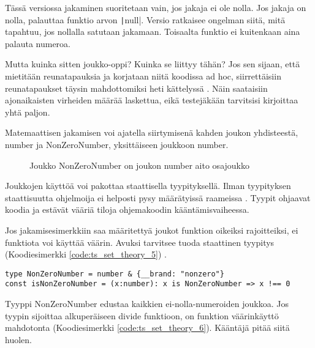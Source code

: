 Tässä versiossa jakaminen suoritetaan vain, jos jakaja ei ole nolla. Jos jakaja on nolla, palauttaa funktio arvon \texttt|null|. Versio ratkaisee ongelman siitä, mitä tapahtuu, jos nollalla satutaan jakamaan. Toisaalta funktio ei kuitenkaan aina palauta numeroa.

Mutta kuinka sitten joukko-oppi? Kuinka se liittyy tähän? Jos sen sijaan, että mietitään reunatapauksia ja korjataan niitä koodissa ad hoc, siirrettäisiin reunatapaukset täysin mahdottomiksi heti kättelyssä \cite{impossiblebetter}. Näin saataisiin ajonaikaisten virheiden määrää laskettua, eikä testejäkään tarvitsisi kirjoittaa yhtä paljon.

Matemaattisen jakamisen voi ajatella siirtymisenä kahden joukon yhdisteestä, number ja NonZeroNumber, yksittäiseen joukkoon number.

\begin{figure}[ht]
    \centering
    \caption{Joukko NonZeroNumber on joukon number aito osajoukko}
    \label{fig:set-esimerkki}
\end{figure}

Joukkojen käyttöä voi pakottaa staattisella tyypityksellä. Ilman tyypityksen staattisuutta ohjelmoija ei helposti pysy määrätyissä raameissa \cite[44]{cantarella_fp_haitat}. Tyypit ohjaavat koodia ja estävät vääriä tiloja ohjemakoodin kääntämisvaiheessa.

Jos jakamisesimerkkiin saa määritettyä joukot funktion oikeiksi rajoitteiksi, ei funktiota voi käyttää väärin. Avuksi tarvitsee tuoda staattinen tyypitys   (Koodiesimerkki \ref{code:ts_set_theory_5}) \cite{typsecript_website}.

\begin{code}
    \begin{verbatim}
type NonZeroNumber = number & {__brand: "nonzero"}
const isNonZeroNumber = (x:number): x is NonZeroNumber => x !== 0
\end{verbatim}
    \label{code:ts_set_theory_5}
    \caption{Joukon NonZeroNumber määrittäminen ja alkion sisältymisen tarkistaminen TypeScriptissä}
\end{code}

Tyyppi NonZeroNumber edustaa kaikkien ei-nolla-numeroiden joukkoa. Jos tyypin sijoittaa alkuperäiseen divide funktioon, on funktion väärinkäyttö mahdotonta (Koodiesimerkki \ref{code:ts_set_theory_6}). Kääntäjä pitää siitä huolen.


